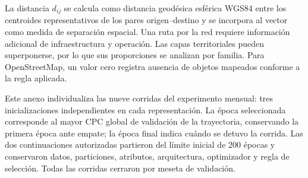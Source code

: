 La distancia $d_{ij}$ se calcula como distancia geodésica esférica WGS84 entre los centroides representativos de los pares origen--destino y se incorpora al vector como medida de separación espacial. Una ruta por la red requiere información adicional de infraestructura y operación. Las capas territoriales pueden superponerse, por lo que sus proporciones se analizan por familia. Para OpenStreetMap, un valor cero registra ausencia de objetos mapeados conforme a la regla aplicada.

\clearpage
{}

Este anexo individualiza las nueve corridas del experimento mensual: tres inicializaciones independientes en cada representación. La época seleccionada corresponde al mayor CPC global de validación de la trayectoria, conservando la primera época ante empate; la época final indica cuándo se detuvo la corrida. Las dos continuaciones autorizadas partieron del límite inicial de 200 épocas y conservaron datos, particiones, atributos, arquitectura, optimizador y regla de selección. Todas las corridas cerraron por meseta de validación.

\begin{table}[H]
  \centering
  \scriptsize
  \caption{Corridas del experimento mensual y selección por validación.}
  \label{tab:anexo_corridas}
\end{table}

